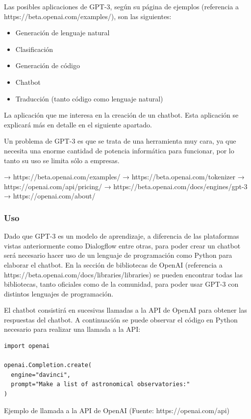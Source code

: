 Las posibles aplicaciones de GPT-3, según su página de ejemplos (referencia a https://beta.openai.com/examples/), son las siguientes:

\begin{itemize}
    \item Generación de lenguaje natural
    \item Clasificación
    \item Generación de código
    \item Chatbot
    \item Traducción (tanto código como lenguaje natural)
\end{itemize}

La aplicación que me interesa en la creación de un chatbot. Esta aplicación se explicará más en detalle en el siguiente apartado.

Un problema de GPT-3 es que se trata de una herramienta muy cara, ya que necesita una enorme cantidad de potencia informática para funcionar, por lo tanto su uso se limita sólo a empresas.





→ https://beta.openai.com/examples/
→ https://beta.openai.com/tokenizer
→ https://openai.com/api/pricing/
→ https://beta.openai.com/docs/engines/gpt-3
→ https://openai.com/about/

\subsubsection*{Uso}

Dado que GPT-3 es un modelo de aprendizaje, a diferencia de las plataformas vistas anteriormente como Dialogflow entre otras, para poder crear un chatbot será necesario hacer uso de un lenguaje de programación como Python para elaborar el chatbot. En la sección de bibliotecas de OpenAI (referencia a https://beta.openai.com/docs/libraries/libraries) se pueden encontrar todas las bibliotecas, tanto oficiales como de la comunidad, para poder usar GPT-3 con distintos lenguajes de programación.

El chatbot consistirá en sucesivas llamadas a la API de OpenAI para obtener las respuestas del chatbot. A continuación se puede observar el código en Python necesario para realizar una llamada a la API:

\begin{lstlisting}
import openai

openai.Completion.create(
  engine="davinci",
  prompt="Make a list of astronomical observatories:"
)
\end{lstlisting}  
\caption{Ejemplo de llamada a la API de OpenAI (Fuente: https://openai.com/api)}

